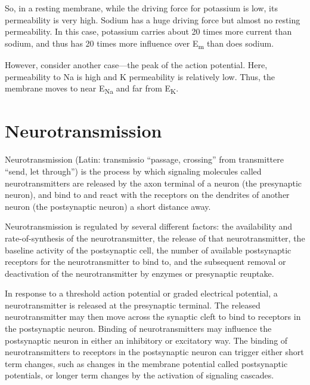 \documentclass[]{book}
\begin{document}
So, in a resting membrane, while the driving force for potassium is low, its permeability is very high. Sodium has a huge driving force but almost no resting permeability. In this case, potassium carries about 20 times more current than sodium, and thus has 20 times more influence over E\textsubscript{m} than does sodium.

However, consider another case---the peak of the action potential. Here, permeability to Na is high and K permeability is relatively low. Thus, the membrane moves to near E\textsubscript{Na} and far from E\textsubscript{K}.

\hypertarget{neurotransmission}{%
\chapter{Neurotransmission}\label{neurotransmission}}

Neurotransmission (Latin: transmissio ``passage, crossing'' from transmittere ``send, let through'') is the process by which signaling molecules called neurotransmitters are released by the axon terminal of a neuron (the presynaptic neuron), and bind to and react with the receptors on the dendrites of another neuron (the postsynaptic neuron) a short distance away.

Neurotransmission is regulated by several different factors: the availability and rate-of-synthesis of the neurotransmitter, the release of that neurotransmitter, the baseline activity of the postsynaptic cell, the number of available postsynaptic receptors for the neurotransmitter to bind to, and the subsequent removal or deactivation of the neurotransmitter by enzymes or presynaptic reuptake.

In response to a threshold action potential or graded electrical potential, a neurotransmitter is released at the presynaptic terminal. The released neurotransmitter may then move across the synaptic cleft to bind to receptors in the postsynaptic neuron. Binding of neurotransmitters may influence the postsynaptic neuron in either an inhibitory or excitatory way. The binding of neurotransmitters to receptors in the postsynaptic neuron can trigger either short term changes, such as changes in the membrane potential called postsynaptic potentials, or longer term changes by the activation of signaling cascades.
\end{document}
